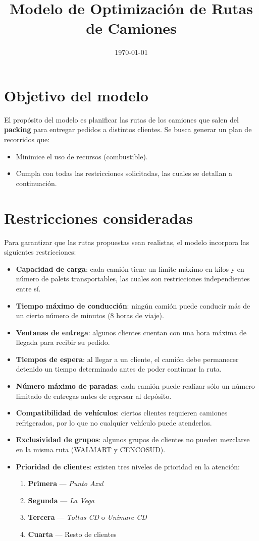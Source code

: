 \documentclass[11pt]{article}
\title{Modelo de Optimización de Rutas de Camiones}
\date{\today}
\begin{document}
\maketitle

\section*{Objetivo del modelo}
El propósito del modelo es planificar las rutas de los camiones que salen del \textbf{packing} para entregar pedidos a distintos clientes.  
Se busca generar un plan de recorridos que:
\begin{itemize}
  \item Minimice el uso de recursos (combustible).
  \item Cumpla con todas las restricciones solicitadas, las cuales se detallan a continuación.
\end{itemize}

\section*{Restricciones consideradas}
Para garantizar que las rutas propuestas sean realistas, el modelo incorpora las siguientes restricciones:
\begin{itemize}
  \item \textbf{Capacidad de carga}: cada camión tiene un límite máximo en kilos y en número de palets transportables, las cuales son restricciones independientes entre sí.
  \item \textbf{Tiempo máximo de conducción}: ningún camión puede conducir más de un cierto número de minutos (8 horas de viaje).
  \item \textbf{Ventanas de entrega}: algunos clientes cuentan con una hora máxima de llegada para recibir su pedido.
  \item \textbf{Tiempos de espera}: al llegar a un cliente, el camión debe permanecer detenido un tiempo determinado antes de poder continuar la ruta.
  \item \textbf{Número máximo de paradas}: cada camión puede realizar sólo un número limitado de entregas antes de regresar al depósito.
  \item \textbf{Compatibilidad de vehículos}: ciertos clientes requieren camiones refrigerados, por lo que no cualquier vehículo puede atenderlos.
  \item \textbf{Exclusividad de grupos}: algunos grupos de clientes no pueden mezclarse en la misma ruta (WALMART y CENCOSUD).
  \item \textbf{Prioridad de clientes}: existen tres niveles de prioridad en la atención:
  \begin{enumerate}
    \item \textbf{Primera} ---  \emph{Punto Azul}
    \item \textbf{Segunda} --- \emph{La Vega}
    \item \textbf{Tercera} --- \emph{Tottus CD} o \emph{Unimarc CD}
    \item \textbf{Cuarta} --- Resto de clientes
  \end{enumerate}
\end{itemize}
\end{document}
